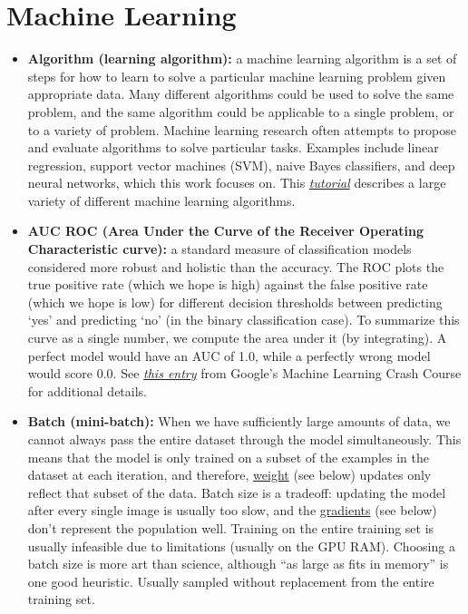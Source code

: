 \section{Machine Learning}
\begin{itemize}
\item \textbf{Algorithm (learning algorithm):\label{tg:algorithm}} a machine learning algorithm is a set of steps for how to learn to solve a particular machine learning problem given appropriate data. Many different algorithms could be used to solve the same problem, and the same algorithm could be applicable to a single problem, or to a variety of problem. Machine learning research often attempts to propose and evaluate algorithms to solve particular tasks. Examples include linear regression, support vector machines (SVM), naive Bayes classifiers, and deep neural networks, which this work focuses on. This \href{https://skymind.ai/wiki/machine-learning-algorithms}{\emph{tutorial}} describes a large variety of different machine learning algorithms.

\item \textbf{AUC ROC (Area Under the Curve of the Receiver Operating Characteristic curve):\label{tg:auc}} a standard measure of classification models considered more robust and holistic than the accuracy. The ROC plots the true positive rate (which we hope is high) against the false positive rate (which we hope is low) for different decision thresholds between predicting `yes' and predicting `no' (in the binary classification case). To summarize this curve as a single number, we compute the area under it (by integrating). A perfect model would have an AUC of 1.0, while a perfectly wrong model would score 0.0. See \href{https://developers.google.com/machine-learning/crash-course/classification/roc-and-auc}{\emph{this entry}} from Google's Machine Learning Crash Course for additional details.

\item \textbf{Batch (mini-batch):\label{tg:batch}} When we have sufficiently large amounts of data, we cannot always pass the entire dataset through the model simultaneously. This means that the model is only trained on a subset of the examples in the dataset at each iteration, and therefore, \hyperref[tg:weights]{weight} (see below) updates only reflect that subset of the data. Batch size is a tradeoff: updating the model after every single image is usually too slow, and the \hyperref[tg:gradient]{gradients} (see below) don't represent the population well. Training on the entire training set is usually infeasible due to limitations (usually on the GPU RAM). Choosing a batch size is more art than science, although ``as large as fits in memory'' is one good heuristic. Usually sampled without replacement from the entire training set.


\end{itemize}
